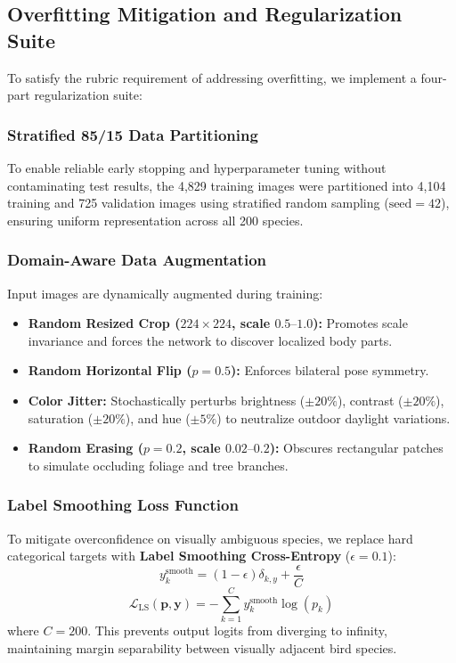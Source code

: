 \documentclass[10pt,twocolumn,letterpaper]{article}
\begin{document}
\subsection{Overfitting Mitigation and Regularization Suite}
To satisfy the rubric requirement of addressing overfitting, we implement a four-part regularization suite:

\subsubsection{Stratified 85/15 Data Partitioning}
To enable reliable early stopping and hyperparameter tuning without contaminating test results, the 4,829 training images were partitioned into 4,104 training and 725 validation images using stratified random sampling ($\text{seed}=42$), ensuring uniform representation across all 200 species.

\subsubsection{Domain-Aware Data Augmentation}
Input images are dynamically augmented during training:
\begin{itemize}
    \item \textbf{Random Resized Crop ($224\times224$, scale $0.5\text{--}1.0$):} Promotes scale invariance and forces the network to discover localized body parts.
    \item \textbf{Random Horizontal Flip ($p=0.5$):} Enforces bilateral pose symmetry.
    \item \textbf{Color Jitter:} Stochastically perturbs brightness ($\pm 20\%$), contrast ($\pm 20\%$), saturation ($\pm 20\%$), and hue ($\pm 5\%$) to neutralize outdoor daylight variations.
    \item \textbf{Random Erasing ($p=0.2$, scale $0.02\text{--}0.2$):} Obscures rectangular patches to simulate occluding foliage and tree branches.
\end{itemize}

\subsubsection{Label Smoothing Loss Function}
To mitigate overconfidence on visually ambiguous species, we replace hard categorical targets with \textbf{Label Smoothing Cross-Entropy} ($\epsilon = 0.1$):
\begin{equation}
    y_k^{\text{smooth}} = (1 - \epsilon)\delta_{k, y} + \frac{\epsilon}{C}
\end{equation}
\begin{equation}
    \mathcal{L}_{\text{LS}}(\mathbf{p}, \mathbf{y}) = - \sum_{k=1}^C y_k^{\text{smooth}} \log(p_k)
\end{equation}
where $C=200$. This prevents output logits from diverging to infinity, maintaining margin separability between visually adjacent bird species.
\end{document}
